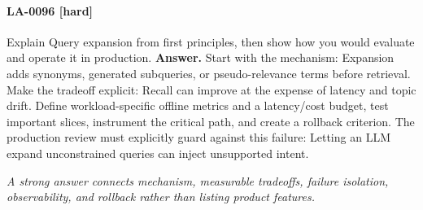 \paragraph{LA-0096 [hard]} Explain Query expansion from first principles, then show how you would evaluate and operate it in production.
\noindent\textbf{Answer.} Start with the mechanism: Expansion adds synonyms, generated subqueries, or pseudo-relevance terms before retrieval. Make the tradeoff explicit: Recall can improve at the expense of latency and topic drift. Define workload-specific offline metrics and a latency/cost budget, test important slices, instrument the critical path, and create a rollback criterion. The production review must explicitly guard against this failure: Letting an LLM expand unconstrained queries can inject unsupported intent.
\par\textit{A strong answer connects mechanism, measurable tradeoffs, failure isolation, observability, and rollback rather than listing product features.}
